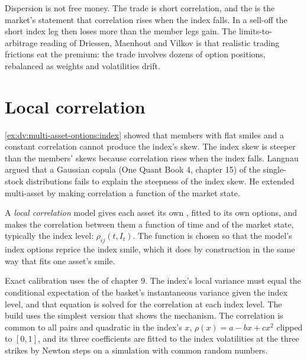 Dispersion is not free money. The trade is short correlation, and the  is the market's statement that
correlation rises when the index falls. In a sell-off the short index leg then loses more than the member legs gain. The limits-to-arbitrage reading of
Driessen, Maenhout and Vilkov is that realistic trading frictions eat the premium: the trade involves dozens of option
positions, rebalanced as weights and volatilities drift.

\section{Local correlation}

\cref{ex:dv:multi-asset-options:index} showed that members with flat smiles and a constant correlation cannot produce the
index's skew. The index skew is steeper than the members' skews because correlation rises when the index falls. Langnau
argued that a Gaussian copula (One Quant Book 4, chapter 15) of the single-stock distributions fails to explain the
steepness of the index skew. He extended multi-asset  by making correlation a function of the market
state.

\begin{definition}\label{def:dv:multi-asset-options:local}
A \emph{local correlation} model gives each asset its own , fitted to its own
options, and makes the correlation between them a function of time and of the market state, typically the index level:
$\rho_{ij}(t,I_t)$. The function is chosen so that the model's index options reprice the index smile, which it does by
construction in the same way that  fits one asset's smile.
\end{definition}

Exact calibration uses the  of chapter 9. The index's local variance must equal the conditional
expectation of the basket's instantaneous variance given the index level, and that equation is solved for the
correlation at each index level. The build uses the simplest version that shows the mechanism. The correlation is
common to all pairs and quadratic in the index's  $x$, $\rho(x)=a-bx+cx^2$ clipped to $[0,1]$, and its three
coefficients are fitted to the index volatilities at the three strikes by Newton steps on a simulation with common random
numbers.

